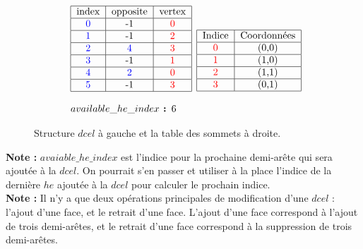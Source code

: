 \documentclass[]{article}
\begin{document}
\begin{figure}[H]
	\[
		\begin{aligned}[c]
			\begin{array}{l}
				\begin{tabular}{|c|c|c|c|}
					\hline
					index         & opposite      & vertex       \\
					\hline
					\color{blue}0 & -1            & \color{red}0 \\
					\hline
					\color{blue}1 & -1            & \color{red}2 \\
					\hline
					\color{blue}2 & \color{blue}4 & \color{red}3 \\
					\hline
					\color{blue}3 & -1            & \color{red}1 \\
					\hline
					\color{blue}4 & \color{blue}2 & \color{red}0 \\
					\hline
					\color{blue}5 & -1            & \color{red}3 \\
					\hline
				\end{tabular} \\\\
				available\_he\_index\textbf{ : }6
			\end{array}
		\end{aligned}
		\begin{aligned}[c]
			\begin{tabular}{|c|c|}
				\hline
				Indice       & Coordonnées \\
				\hline
				\color{red}0 & (0,0)       \\
				\hline
				\color{red}1 & (1,0)       \\
				\hline
				\color{red}2 & (1,1)       \\
				\hline
				\color{red}3 & (0,1)       \\
				\hline
			\end{tabular}
		\end{aligned}
	\]
	\caption{Structure $dcel$ à gauche et la table des sommets à droite.}
	\label{maillage_simple_struct_associee}
\end{figure}

\textbf{Note :} $avaiable\_he\_index$ est l'indice pour la prochaine demi-arête qui sera ajoutée à la $dcel$. On pourrait s'en passer et utiliser à la place l'indice de la dernière $he$ ajoutée à la $dcel$ pour calculer le prochain indice.\\

\textbf{Note :} Il n'y a que deux opérations principales de modification d'une $dcel$ : l'ajout d'une face, et le retrait d'une face. L'ajout d'une face correspond à l'ajout de trois demi-arêtes, et le retrait d'une face correspond à la suppression de trois demi-arêtes.
\end{document}
